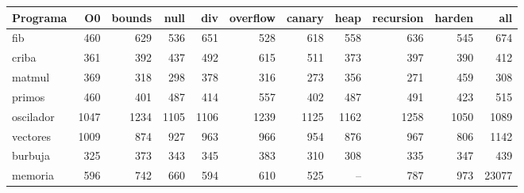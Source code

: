\begin{tabular}{lrrrrrrrrrr}\toprule
Programa & O0 & bounds & null & div & overflow & canary & heap & recursion & harden & all \\\midrule
fib & 460 & 629 & 536 & 651 & 528 & 618 & 558 & 636 & 545 & 674 \\
criba & 361 & 392 & 437 & 492 & 615 & 511 & 373 & 397 & 390 & 412 \\
matmul & 369 & 318 & 298 & 378 & 316 & 273 & 356 & 271 & 459 & 308 \\
primos & 460 & 401 & 487 & 414 & 557 & 402 & 487 & 491 & 423 & 515 \\
oscilador & 1047 & 1234 & 1105 & 1106 & 1239 & 1125 & 1162 & 1258 & 1050 & 1089 \\
vectores & 1009 & 874 & 927 & 963 & 966 & 954 & 876 & 967 & 806 & 1142 \\
burbuja & 325 & 373 & 343 & 345 & 383 & 310 & 308 & 335 & 347 & 439 \\
memoria & 596 & 742 & 660 & 594 & 610 & 525 & -- & 787 & 973 & 23077 \\
\bottomrule\end{tabular}
